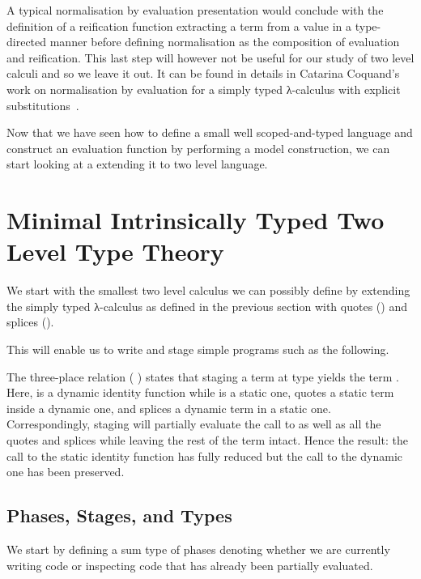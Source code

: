 A typical normalisation by evaluation presentation would
conclude with the definition of a reification function
extracting a term from a value in a type-directed manner
before defining normalisation as the composition of evaluation
and reification.
%
This last step will however not be useful for our study of two
level calculi and so we leave it out. It can be found in details
in Catarina Coquand's work on normalisation by evaluation for
a simply typed λ-calculus with explicit
substitutions~\cite{DBLP:journals/lisp/Coquand02}.

Now that we have seen how to define a small well scoped-and-typed
language and construct an evaluation function by performing a model
construction, we can start looking at a extending it to two level
language.

\section{Minimal Intrinsically Typed Two Level Type Theory}

We start with the smallest two level calculus we can possibly define
by extending the simply typed λ-calculus as defined in the previous
section with quotes () and splices ().

This will enable us to write and stage simple programs such as the following.


The three-place relation (    ) states
that staging a term  at type  yields the term .
%
Here,  is a dynamic identity function
while  is a static one,
 quotes a static term inside a dynamic one,
and  splices a dynamic term in a static one.
%
Correspondingly, staging will partially evaluate the call to
 as well as all the quotes and splices while leaving
the rest of the term intact.
%
Hence the result: the call to the static identity function has
fully reduced but the call to the dynamic one has been preserved.


\subsection{Phases, Stages, and Types}

We start by defining a sum type of phases denoting whether
we are currently writing  code or inspecting
 code that has already been partially evaluated.

